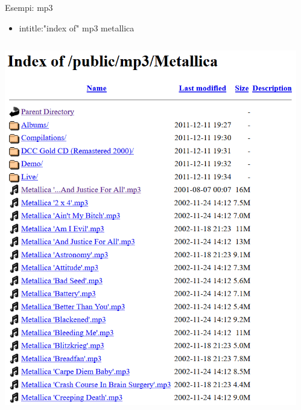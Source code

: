 \documentclass{beamer}
\begin{document}
\begin{frame}{Esempi: mp3}
\begin{itemize}
\item \begin{center}intitle:"index of" mp3 metallica\end{center}
\end{itemize}
\begin{columns}
\begin{column}{0.5\textwidth}
\begin{center}
\includegraphics[width=\textwidth]{immagini/metallica.png}     
\end{center}
\end{column}
\begin{column}{0.5\textwidth}  
\begin{center}

\end{center}
\end{column}
\end{columns}
\end{frame}
\end{document}
